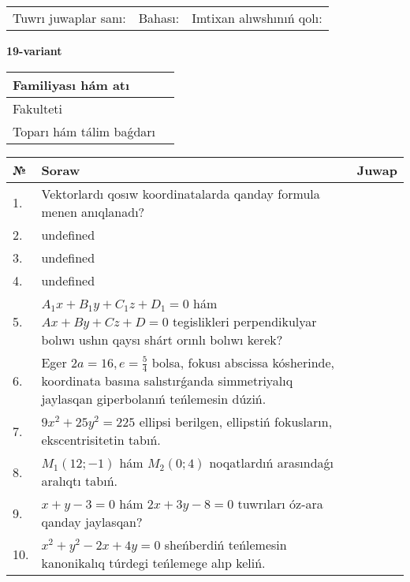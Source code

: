 \documentclass{article}
\begin{document}
\vspace{0.7cm}

\begin{tabular}{lll}
Tuwrı juwaplar sanı: \underline{\hspace{1cm}} & 
Bahası: \underline{\hspace{1cm}} & 
Imtixan alıwshınıń qolı: \underline{\hspace{2cm}} \\
\end{tabular}

\egroup

\newpage


\textbf{19-variant}\\

\bgroup
\def\arraystretch{1.6} %

\begin{tabular}{|m{5.7cm}|m{9.5cm}|}
\hline
Familiyası hám atı & \\
\hline
Fakulteti  & \\
\hline
Toparı hám tálim baǵdarı  & \\
\hline
\end{tabular}

\vspace{0.7cm}

\begin{tabular}{|m{0.7cm}|m{10cm}|m{4cm}|}
\hline
№ & Soraw & Juwap \\
\hline
1. & Vektorlardı qosıw koordinatalarda qanday formula menen anıqlanadı? &  \\
\hline
2. & undefined &  \\
\hline
3. & undefined &  \\
\hline
4. & undefined &  \\
\hline
5. & \(A_{1}x + B_{1}y + C_{1}z + D_{1} = 0\) hám \(Ax + By + Cz + D = 0\) tegislikleri perpendikulyar bolıwı ushın qaysı shárt orınlı bolıwı kerek? &  \\
\hline
6. & Eger \(2 a = 16, e = \frac{5}{4}\) bolsa, fokusı abscissa kósherinde, koordinata basına salıstırǵanda simmetriyalıq jaylasqan giperbolanıń teńlemesin dúziń. &  \\
\hline
7. & \(9 x^{2} + 25 y^{2} = 225\) ellipsi berilgen, ellipstiń fokusların, ekscentrisitetin tabıń. &  \\
\hline
8. & \(M_{1} (12; - 1)\) hám \(M_{2} (0;4)\) noqatlardıń arasındaǵı aralıqtı tabıń. &  \\
\hline
9. & \(x + y - 3 = 0\) hám \(2 x + 3 y - 8 = 0\) tuwrıları óz-ara qanday jaylasqan? &  \\
\hline
10. & \(x^{2} + y^{2} - 2 x + 4 y = 0\) sheńberdiń teńlemesin kanonikalıq túrdegi teńlemege alıp keliń. & \\
\hline
\end{tabular}
\end{document}
